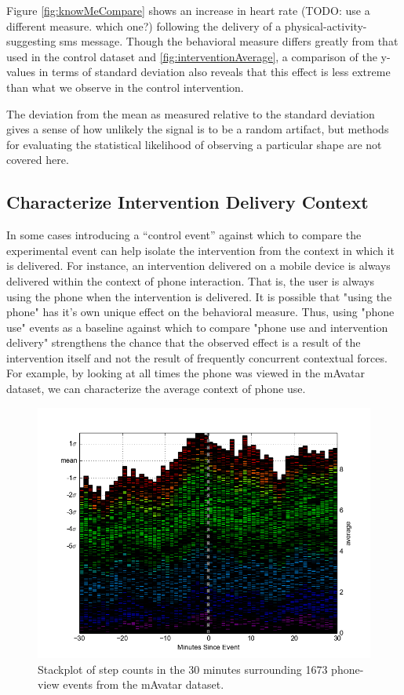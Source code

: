 Figure \ref{fig:knowMeCompare} shows an increase in heart rate (TODO: use a different measure. which one?) following the delivery of a physical-activity-suggesting sms message.
Though the behavioral measure differs greatly from that used in the control dataset and \ref{fig:interventionAverage}, a comparison of the y-values in terms of standard deviation also reveals that this effect is less extreme than what we observe in the control intervention.

The deviation from the mean as measured relative to the standard deviation gives a sense of how unlikely the signal is to be a random artifact, but methods for evaluating the statistical likelihood of observing a particular shape are not covered here.

\subsection{Characterize Intervention Delivery Context}
In some cases introducing a “control event” against which to compare the experimental event can help isolate the intervention from the context in which it is delivered.
For instance, an intervention delivered on a mobile device is always delivered within the context of phone interaction.
That is, the user is always using the phone when the intervention is delivered.
It is possible that "using the phone" has it's own unique effect on the behavioral measure.
Thus, using "phone use" events as a baseline against which to compare "phone use and intervention delivery" strengthens the chance that the observed effect is a result of the intervention itself and not the result of frequently concurrent contextual forces. 
For example, by looking at all times the phone was viewed in the mAvatar dataset, we can characterize the average context of phone use.

\begin{figure}
\centering
\includegraphics[width=0.9\columnwidth]{./img/mAvatarViews_1673_wOverlap.png}
\caption{Stackplot of step counts in the 30 minutes surrounding 1673 phone-view events from the mAvatar dataset.}
\label{fig:mAvatarPhoneContext}
\end{figure}

